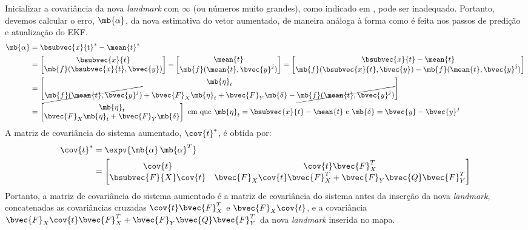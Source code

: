 Inicializar a covariância da nova \textit{landmark} com $\infty$ (ou 
números muito grandes), como indicado em 
\cite[p.~317]{thrun2005probabilistic}, pode ser inadequado. Portanto, devemos 
calcular o erro, $\mb{\alpha}$, da nova estimativa do vetor aumentado, de 
maneira análoga à forma como é feita nos passos de predição e atualização 
do EKF. 
\begin{equation}
\begin{aligned}
   \mb{\alpha} &= \bsubvec{x}{t}^* - \mean{t}^*\\
   &= \begin{bmatrix}
       \bsubvec{x}{t} \\ \mb{f}(\bsubvec{x}{t}, \bvec{y})
   \end{bmatrix} - \begin{bmatrix}
       \mean{t} \\ \mb{f}(\mean{t}, \bvec{y}^j)
   \end{bmatrix} = \begin{bmatrix}
       \bsubvec{x}{t} - \mean{t}\\
       \mb{f}(\bsubvec{x}{t}, \bvec{y}) - \mb{f}(\mean{t}, \bvec{y}^j)
   \end{bmatrix}\\
   &= \begin{bmatrix}
       \mb{\eta}_t \\
       \cancel{\mb{f}(\mean{t}, \bvec{y}^j)} + 
       \bvec{F}_X \mb{\eta}_t + \bvec{F}_Y \mb{\delta}
       - \cancel{\mb{f}(\mean{t}, \bvec{y}^j)}
   \end{bmatrix} \\
    &= \begin{bmatrix}
       \mb{\eta}_t \\
       \bvec{F}_X \mb{\eta}_t + \bvec{F}_Y \mb{\delta} 
   \end{bmatrix} \text{ em que $\mb{\eta}_t = \bsubvec{x}{t} - \mean{t}$ e $\mb{\delta} = \bvec{y} - \bvec{y}^j$}
\end{aligned}
\end{equation}
A matriz de covariância do sistema aumentado, $\cov{t}^*$, é obtida por:
\renewcommand{\arraystretch}{1.5}
\newcommand{\eqCovarianceAugmented}{\begin{bmatrix}
       \cov{t} & \cov{t} \bvec{F}_X^T\\
       \bsubvec{F}{X} \cov{t} &  \bvec{F}_X \cov{t} \bvec{F}_X^T 
       + \bvec{F}_Y \bvec{Q} \bvec{F}_Y^T
    \end{bmatrix}}
\begin{equation}
\begin{aligned}
  \cov{t}^* &= \expv{\mb{\alpha} \,\mb{\alpha}^T} \\
  &= \eqCovarianceAugmented
\end{aligned}
\label{eq:ekf-landmark-insertion-covariance}
\end{equation}
\renewcommand{\arraystretch}{1}
Portanto, a matriz de covariância do sistema aumentado é a matriz de 
covariância do sistema antes da inserção da nova \textit{landmark}, 
concatenadas as covariâncias cruzadas $\cov{t} \bvec{F}_X^T$ e $\bvec{F}_X \cov{t}$, e a covariância $\bvec{F}_X \cov{t} \bvec{F}_X^T + \bvec{F}_Y 
\bvec{Q} \bvec{F}_Y^T$ da nova \textit{landmark} inserida no mapa. 

